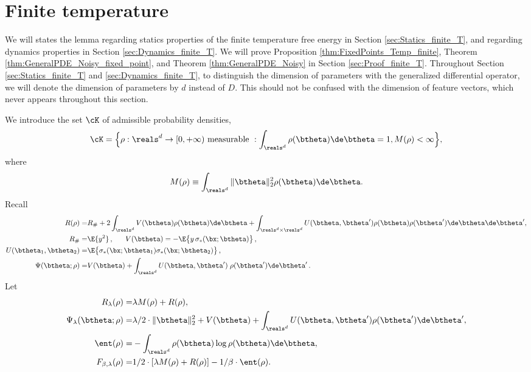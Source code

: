 \documentclass[11pt]{article}
\begin{document}
\section{Finite temperature}\label{sec:FiniteT}

We will states the lemma regarding statics properties of the finite temperature free energy in Section \ref{sec:Statics_finite_T}, and regarding dynamics properties in Section \ref{sec:Dynamics_finite_T}. We will prove Proposition \ref{thm:FixedPoints_Temp_finite}, Theorem \ref{thm:GeneralPDE_Noisy_fixed_point}, and Theorem \ref{thm:GeneralPDE_Noisy} in Section \ref{sec:Proof_finite_T}. Throughout Section \ref{sec:Statics_finite_T} and \ref{sec:Dynamics_finite_T}, to distinguish the dimension of parameters with the generalized differential operator, we will denote the dimension of parameters by $d$ instead of $D$. This should not be confused with the dimension of feature vectors, which never appears throughout this section. 

We introduce the set $\cK$ of admissible probability densities, 
\begin{align}
\cK = \Big\{ \rho: \reals^d \to [0, +\infty) \text{ measurable } : \int_{\reals^d} \rho(\btheta) \de \btheta = 1, M(\rho) < \infty \Big\},
\end{align}
where
\begin{align}
M(\rho) \equiv \int_{\reals^d} \| \btheta \|_2^2 \rho(\btheta) \de \btheta. 
\end{align}
Recall
\begin{align}
R(\rho) =&  R_{\#}+2 \int_{\reals^d} V(\btheta) \rho(\btheta) \de \btheta + \int_{\reals^d \times \reals^d} U(\btheta, \btheta') \rho(\btheta) \rho(\btheta') \de \btheta \de \btheta',\\
R_{\#}  =& \E\{y^2\}\, ,\;\;\;\;\;\; V(\btheta) = - \E\big\{y\,\sigma_*(\bx;\btheta)\big\}\, ,\\
U(\btheta_1, \btheta_2)  =& \E\big\{\sigma_*(\bx;\btheta_1) \sigma_*(\bx;\btheta_2)\big\}\,,\\
\Psi(\btheta;\rho) =& V(\btheta)+ \int_{\reals^d} U(\btheta, \btheta')\; \rho(\btheta') \de \btheta'\, .
\end{align}
Let 
\begin{align}
R_\lambda(\rho)=& \lambda M(\rho) + R(\rho),\\
\Psi_\lambda(\btheta; \rho) =& \lambda/2 \cdot \| \btheta \|_2^2 + V(\btheta) + \int_{\reals^d} U(\btheta, \btheta') \rho(\btheta') \de \btheta',\\
\ent(\rho) =& - \int_{\reals^d} \rho(\btheta) \log \rho(\btheta) \de \btheta,\\
F_{\beta, \lambda}(\rho) =& 1/2 \cdot [\lambda M(\rho) + R(\rho)] - 1/\beta \cdot \ent(\rho). 
\end{align}
\end{document}
